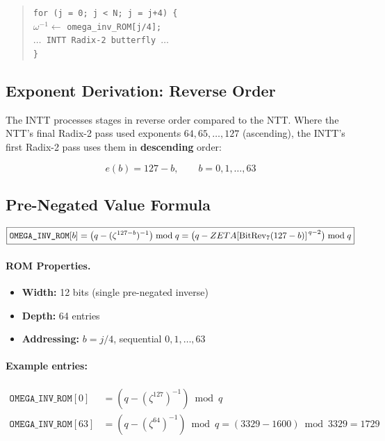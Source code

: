 \documentclass[11pt,a4paper]{article}
\newcommand{\brev}[1]{\operatorname{BitRev}_{7}\!\left(#1\right)}
\begin{document}
\begin{quote}
\texttt{for (j = 0; j < N; j = j+4) \{}\\
\quad $\omega^{-1} \leftarrow$ \texttt{omega\_inv\_ROM[j/4];}\\
\quad\quad \texttt{$\ldots$ INTT Radix-2 butterfly $\ldots$}\\
\texttt{\}}
\end{quote}

\subsection{Exponent Derivation: Reverse Order}

The INTT processes stages in reverse order compared to the NTT. Where the NTT's final Radix-2 pass used exponents $64, 65, \ldots, 127$ (ascending), the INTT's first Radix-2 pass uses them in \textbf{descending} order:

\begin{equation}
  e(b) = 127 - b, \qquad b = 0, 1, \ldots, 63
\end{equation}

\subsection{Pre-Negated Value Formula}

\begin{equation}
  \boxed{%
    \texttt{OMEGA\_INV\_ROM}[b]
    = \bigl(q - (\zeta^{127-b})^{-1}\bigr) \bmod q
    = \bigl(q - ZETA\!\left[\brev{127-b}\right]^{\,q-2}\bigr) \bmod q
  }
  \label{eq:omega-inv-rom}
\end{equation}

\paragraph{ROM Properties.}
\begin{itemize}
  \item \textbf{Width:} 12 bits (single pre-negated inverse)
  \item \textbf{Depth:} 64 entries
  \item \textbf{Addressing:} $b = j/4$, sequential $0, 1, \ldots, 63$
\end{itemize}

\paragraph{Example entries:}
\begin{align*}
  \texttt{OMEGA\_INV\_ROM}[0]  &= (q - (\zeta^{127})^{-1}) \bmod q \\
  \texttt{OMEGA\_INV\_ROM}[63] &= (q - (\zeta^{64})^{-1}) \bmod q = (3329 - 1600) \bmod 3329 = 1729
\end{align*}
\end{document}
